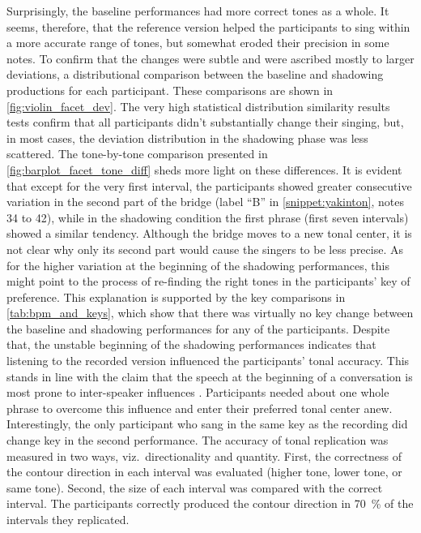 %
Surprisingly, the baseline performances had more correct tones as a whole.
It seems, therefore, that the reference version helped the participants to sing within a more accurate range of tones, but somewhat eroded their precision in some notes.
To confirm that the changes were subtle and were ascribed mostly to larger deviations, a distributional comparison between the baseline and shadowing productions for each participant.
These comparisons are shown in \cref{fig:violin_facet_dev}.
The very high statistical distribution similarity results tests confirm that all participants didn't substantially change their singing, but, in most cases, the deviation distribution in the shadowing phase was less scattered.
The tone-by-tone comparison presented in \cref{fig:barplot_facet_tone_diff} sheds more light on these differences.
It is evident that except for the very first interval, the participants showed greater consecutive variation in the second part of the bridge (label \enquote{B} in \cref{snippet:yakinton}, notes 34 to 42), while in the shadowing condition the first phrase (first seven intervals) showed a similar tendency.
Although the bridge moves to a new tonal center, it is not clear why only its second part would cause the singers to be less precise.
As for the higher variation at the beginning of the shadowing performances, this might point to the process of re-finding the right tones in the participants' key of preference.
This explanation is supported by the key comparisons in \cref{tab:bpm_and_keys}, which show that there was virtually no key change between the baseline and shadowing performances for any of the participants.
Despite that, the unstable beginning of the shadowing performances indicates that listening to the recorded version influenced the participants' tonal accuracy.
This stands in line with the claim that the speech at the beginning of a conversation is most prone to inter-speaker influences \citep[e.g.][]{Orlob2018nine}.
Participants needed about one whole phrase to overcome this influence and enter their preferred tonal center anew.
Interestingly, the only participant who sang in the same key as the recording did change key in the second performance.
The accuracy of tonal replication was measured in two ways, viz.\ directionality and quantity.
First, the correctness of the contour direction in each interval was evaluated (higher tone, lower tone, or same tone).
Second, the size of each interval was compared with the correct interval.
The participants correctly produced the contour direction in \SI{70}{\percent} of the intervals they replicated.
